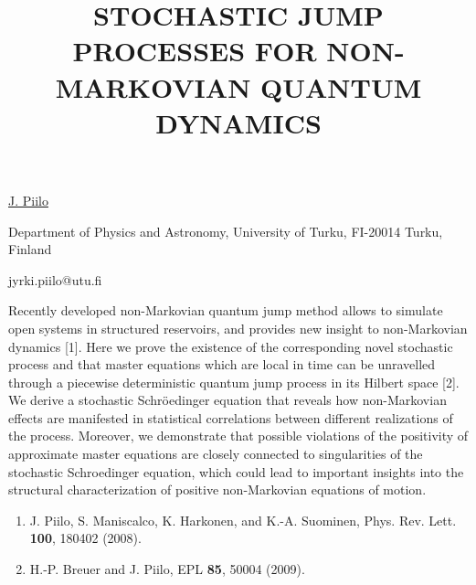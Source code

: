 \title{STOCHASTIC JUMP PROCESSES FOR NON-MARKOVIAN QUANTUM DYNAMICS}

\underline{J. Piilo} 

{\normalsize{\vspace{-4mm}
Department of Physics and Astronomy, University of Turku, FI-20014
Turku, Finland

\email jyrki.piilo@utu.fi}}

Recently developed non-Markovian quantum jump method allows to simulate open systems in structured reservoirs, and
provides new insight to non-Markovian dynamics [1]. Here we prove the existence of the corresponding novel stochastic process
and that master equations which are local in time can be unravelled through a piecewise deterministic quantum jump process in
its Hilbert space [2]. We derive a stochastic Schr\"{o}edinger equation that reveals how non-Markovian effects are manifested in
statistical correlations between different realizations of the process. Moreover, we demonstrate that possible violations of the
positivity of approximate master equations are closely connected to singularities of the stochastic Schroedinger equation, which
could lead to important insights into the structural characterization of positive non-Markovian equations of motion.

\vspace{-4mm} {\normalsize \begin{enumerate} \item J. Piilo, S.
Maniscalco, K. Harkonen, and K.-A. Suominen, Phys. Rev. Lett.
\textbf{100}, 180402 (2008). \item H.-P. Breuer and J. Piilo, EPL
\textbf{85}, 50004 (2009).
\end{enumerate}
}

\vspace{\baselineskip}